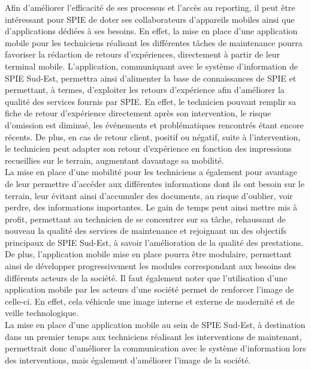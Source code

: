 Afin d’améliorer l’efficacité de ses processus et l’accès au reporting, il peut être intéressant pour SPIE de doter ses collaborateurs d’appareils mobiles ainsi que d’applications dédiées à ses besoins. En effet, la mise en place d’une application mobile pour les techniciens réalisant les différentes tâches de maintenance pourra favoriser la rédaction de retours d’expériences, directement à partir de leur terminal mobile. L’application, communiquant avec le système d’information de SPIE Sud-Est, permettra ainsi d’alimenter la base de connaissances de SPIE et permettant, à termes, d’exploiter les retours d’expérience afin d’améliorer la qualité des services fournis par SPIE. En effet, le technicien pouvant remplir sa fiche de retour d’expérience directement après son intervention, le risque d’omission est diminué, les événements et problématiques rencontrés étant encore récents. De plus, en cas de retour client, positif ou négatif, suite à l’intervention, le technicien peut adapter son retour d’expérience en fonction des impressions recueillies sur le terrain, augmentant davantage sa mobilité. \\

La mise en place d’une mobilité pour les techniciens a également pour avantage de leur permettre d’accéder aux différentes informations dont ils ont besoin sur le terrain, leur évitant ainsi d’accumuler des documents, au risque d’oublier, voir perdre, des informations importantes. Le gain de temps peut ainsi mettre mis à profit, permettant au technicien de se concentrer sur sa tâche, rehaussant de nouveau la qualité des services de maintenance et rejoignant un des objectifs principaux de SPIE Sud-Est, à savoir l’amélioration de la qualité des prestations. \\

De plus, l’application mobile mise en place pourra être modulaire, permettant ainsi de développer progressivement les modules correspondant aux besoins des différents acteurs de la société. Il faut également noter que l’utilisation d’une application mobile par les acteurs d’une société permet de renforcer l’image de celle-ci. En effet, cela véhicule une image interne et externe de modernité et de veille technologique.\\

La mise en place d’une application mobile au sein de SPIE Sud-Est, à destination dans un premier temps aux techniciens réalisant les interventions de maintenant, permettrait donc d’améliorer la communication avec le système d’information lors des interventions, mais également d’améliorer l’image de la société.\\


